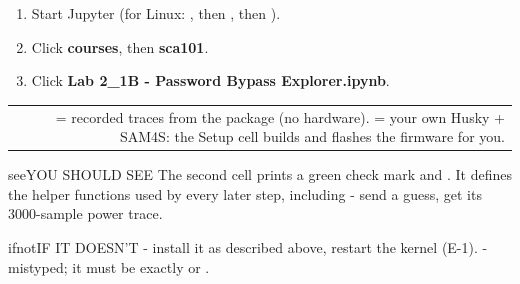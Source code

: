 \documentclass[11pt,letterpaper]{article}
\begin{document}
\begin{enumerate}[label=\arabic*.,leftmargin=1.8em,itemsep=2pt,topsep=2pt,parsep=0pt,start=1]
\item Start Jupyter (for Linux: , then , then ).
\item Click \textbf{courses}, then \textbf{sca101}.
\item Click \textbf{Lab 2\_1B - Password Bypass Explorer.ipynb}.
\end{enumerate}

\vspace{4pt}


{\small{}
\begin{longtable}{|R{0.2391}|R{0.1522}|R{0.6087}|}
\hline
{} &  &  \\ \hline
\endhead
{} &  &  = recorded traces from the  package (no hardware).  = your own Husky + SAM4S: the Setup cell builds and flashes the firmware for you. \\ \hline
\end{longtable}}

\vspace{4pt}


\begin{guidecallout}{see}{YOU SHOULD SEE}
The second cell prints a green check mark and . It defines
the helper functions used by every later step, including  - send a guess, get its 3000-sample
power trace.
\end{guidecallout}

\begin{guidecallout}{ifnot}{IF IT DOESN'T}
 - install it as described above, restart the
kernel (E-1).  - mistyped; it must be exactly 
or .
\end{guidecallout}

\vspace{4pt}
\end{document}
